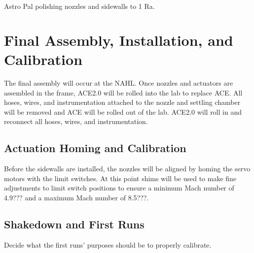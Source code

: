 Astro Pal polishing nozzles and sidewalls to 1 Ra.

\section{Final Assembly, Installation, and Calibration}

The final assembly will occur at the NAHL. Once nozzles and actuators are assembled in the frame, ACE2.0 will be rolled into the lab to replace ACE. All hoses, wires, and instrumentation attached to the nozzle and settling chamber will be removed and ACE will be rolled out of the lab. ACE2.0 will roll in and reconnect all hoses, wires, and instrumentation.

\subsection{Actuation Homing and Calibration}

Before the sidewalls are installed, the nozzles will be aligned by homing the servo motors with the limit switches. At this point shims will be used to make fine adjustments to limit switch positions to ensure a minimum Mach number of 4.9??? and a maximum Mach number of 8.5???.

\subsection{Shakedown and First Runs}

Decide what the first runs' purposes should be to properly calibrate.

